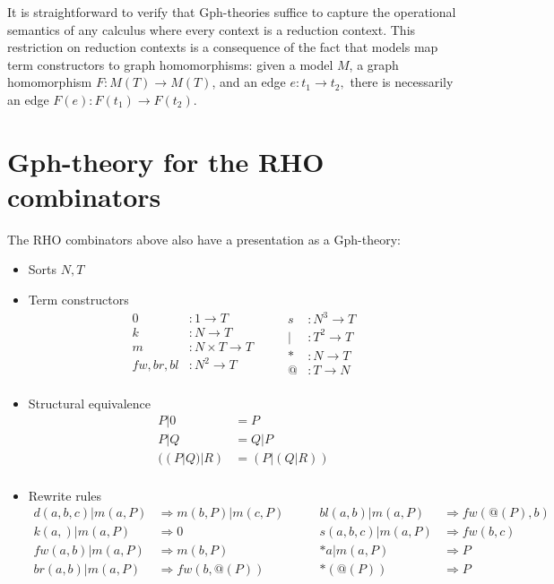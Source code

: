 \documentclass{llncs}
\newcommand{\maps}{\colon}
\begin{document}
It is straightforward to verify that Gph-theories suffice to capture the operational semantics of any calculus where every context is a reduction context.  This restriction on reduction contexts is a consequence of the fact that models map term constructors to graph homomorphisms: given a model $M$, a graph homomorphism $F\maps M(T) \to M(T)$, and an edge $e\maps t_1 \to t_2,$ there is necessarily an edge $F(e)\maps F(t_1) \to F(t_2).$

\section{Gph-theory for the RHO combinators}
The RHO combinators above also have a presentation as a Gph-theory:
\begin{itemize}
  \item Sorts $N, T$
  \item Term constructors
    \[\begin{array}{rl}
      0 &: 1 \to T \\
      k &: N \to T \\
      m &: N \times T \to T \\
      fw,br,bl &: N^2 \to T \\
    \end{array} \quad \quad
    \begin{array}{rl}
      s &: N^3 \to T \\
      | &: T^2 \to T \\
      * &: N \to T \\
      @ &: T \to N \\
    \end{array}\]
  \item Structural equivalence
    \[\begin{array}{rl}
      P | 0 & = P \\
      P | Q & = Q | P \\
      ((P | Q) | R) & = (P | (Q | R)) \\
    \end{array}\]
  \item Rewrite rules
    \[\begin{array}{rl}
      d(a,b,c) | m(a,P) & \Rightarrow m(b,P) | m(c,P) \\
      k(a,) | m(a,P) & \Rightarrow 0 \\
      fw(a,b) | m(a,P) & \Rightarrow m(b,P) \\
      br(a,b) | m(a,P) & \Rightarrow fw(b,@(P)) \\
    \end{array} \quad \quad
    \begin{array}{rl}
      bl(a,b) | m(a,P) & \Rightarrow fw(@(P),b) \\
      s(a,b,c) | m(a,P) & \Rightarrow fw(b,c) \\
      *a | m(a,P) & \Rightarrow P \\
      *(@(P)) & \Rightarrow P \\
    \end{array}\]
\end{itemize}
\end{document}
